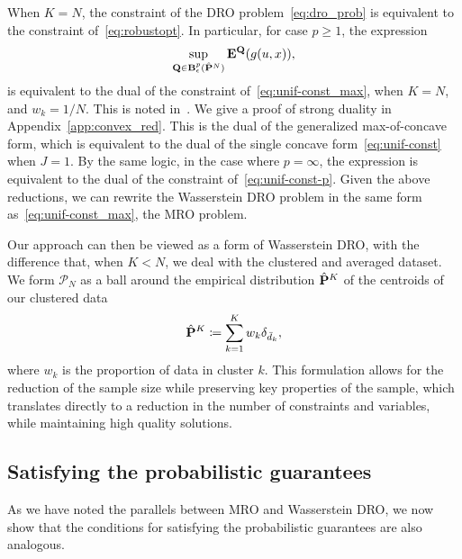 \documentclass[12pt]{article}
\newcommand{\citep}{\cite}
\theoremstyle{thmstyleone}%
\theoremstyle{thmstyletwo}%
\theoremstyle{thmstylethree}%
\newcommand{\reviewChanges}{}
\begin{document}
When $K=N$, the constraint of the \gls{DRO} problem~\eqref{eq:dro_prob} is equivalent to the constraint of~\eqref{eq:robustopt}.
In particular, for case $p \geq 1$, the expression
\begin{equation}
\label{eq:dro-reduct}
\begin{aligned}
    \sup_{\mathbf{Q}\in \mathbf{B}_\epsilon^p(\hat{{\mathbf P}}^N)} \mathbf{E}^\mathbf{Q}(g(u,x)),
	\end{aligned}
\end{equation}
is equivalent to the dual of the constraint of~\eqref{eq:unif-const_max}, when $K = N$, and $w_k = 1/N$. 
This is noted in~\citep{kuhn2019wasserstein,zhen2021mathematical}.
We give a proof of strong duality in Appendix~\ref{app:convex_red}.
\reviewChanges{This is the dual of the generalized max-of-concave form, which is equivalent to the dual of the single concave form~\eqref{eq:unif-const} when $J = 1$. }
By the same logic, in the case where $p = \infty$, the expression is equivalent to the dual of the constraint of~\eqref{eq:unif-const-p}.
Given the above reductions, we can rewrite the Wasserstein \gls{DRO} problem in the same form as~\eqref{eq:unif-const_max}, the \gls{MRO} problem.

Our approach can then be viewed as a form of Wasserstein \gls{DRO}, with the difference that, when $K<N$, we deal with the clustered and averaged dataset.
We form $\mathcal{P}_N$ as a ball around the empirical distribution $\hat{{\mathbf P}}^K$ of the centroids of our clustered data
\begin{equation*}
\hat{{\mathbf P}}^K \coloneqq \sum_{k=1}^K w_k\delta_{\bar{d}_k},
\end{equation*}
where $w_k$ is the proportion of data in cluster $k$.
This formulation allows for the reduction of the sample size while preserving key properties of the sample, which translates directly to a reduction in the number of constraints and variables, while maintaining high quality solutions.

\subsection{Satisfying the probabilistic guarantees}
\label{par:gau}
As we have noted the parallels between \gls{MRO} and Wasserstein \gls{DRO}, we now show that the conditions for satisfying the probabilistic guarantees are also analogous.
\end{document}
